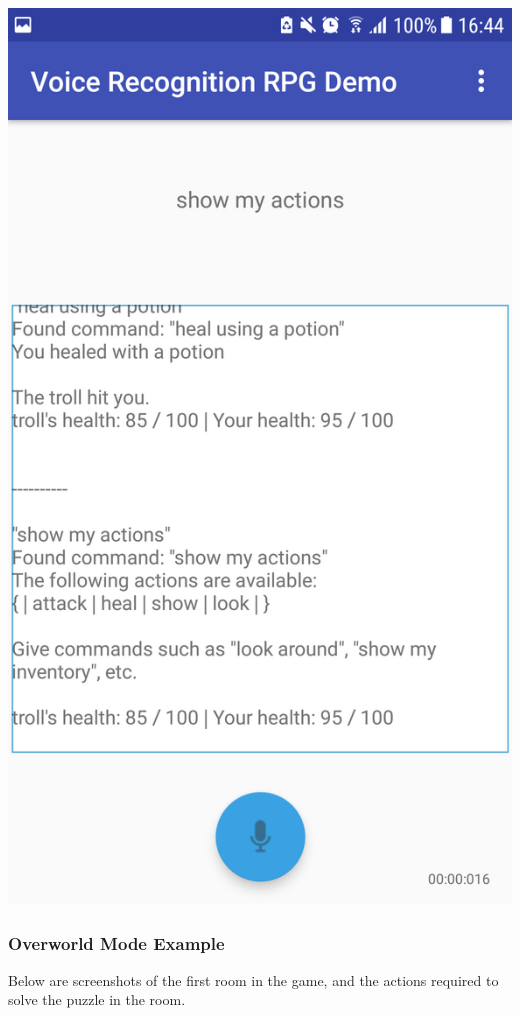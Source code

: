 \documentclass[11pt]{article}
\begin{document}
\begin{center}
\includegraphics[scale=0.18]{battle-4.png}
\end{center}

\newpage
\subsubsection{Overworld Mode Example}
\label{appendix:overworld-mode-screenshots}
Below are screenshots of the first room in the game, and the actions required to solve the puzzle in the room.
\end{document}
